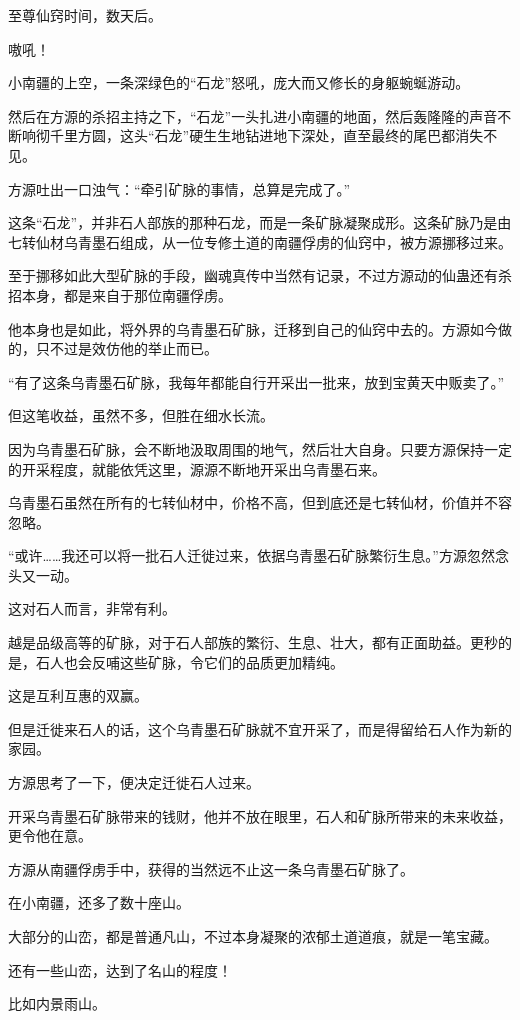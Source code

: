 \begin{this_body}
至尊仙窍时间，数天后。

嗷吼！

小南疆的上空，一条深绿色的“石龙”怒吼，庞大而又修长的身躯蜿蜒游动。

然后在方源的杀招主持之下，“石龙”一头扎进小南疆的地面，然后轰隆隆的声音不断响彻千里方圆，这头“石龙”硬生生地钻进地下深处，直至最终的尾巴都消失不见。

方源吐出一口浊气：“牵引矿脉的事情，总算是完成了。”

这条“石龙”，并非石人部族的那种石龙，而是一条矿脉凝聚成形。这条矿脉乃是由七转仙材乌青墨石组成，从一位专修土道的南疆俘虏的仙窍中，被方源挪移过来。

至于挪移如此大型矿脉的手段，幽魂真传中当然有记录，不过方源动的仙蛊还有杀招本身，都是来自于那位南疆俘虏。

他本身也是如此，将外界的乌青墨石矿脉，迁移到自己的仙窍中去的。方源如今做的，只不过是效仿他的举止而已。

“有了这条乌青墨石矿脉，我每年都能自行开采出一批来，放到宝黄天中贩卖了。”

但这笔收益，虽然不多，但胜在细水长流。

因为乌青墨石矿脉，会不断地汲取周围的地气，然后壮大自身。只要方源保持一定的开采程度，就能依凭这里，源源不断地开采出乌青墨石来。

乌青墨石虽然在所有的七转仙材中，价格不高，但到底还是七转仙材，价值并不容忽略。

“或许……我还可以将一批石人迁徙过来，依据乌青墨石矿脉繁衍生息。”方源忽然念头又一动。

这对石人而言，非常有利。

越是品级高等的矿脉，对于石人部族的繁衍、生息、壮大，都有正面助益。更秒的是，石人也会反哺这些矿脉，令它们的品质更加精纯。

这是互利互惠的双赢。

但是迁徙来石人的话，这个乌青墨石矿脉就不宜开采了，而是得留给石人作为新的家园。

方源思考了一下，便决定迁徙石人过来。

开采乌青墨石矿脉带来的钱财，他并不放在眼里，石人和矿脉所带来的未来收益，更令他在意。

方源从南疆俘虏手中，获得的当然远不止这一条乌青墨石矿脉了。

在小南疆，还多了数十座山。

大部分的山峦，都是普通凡山，不过本身凝聚的浓郁土道道痕，就是一笔宝藏。

还有一些山峦，达到了名山的程度！

比如内景雨山。


\end{this_body}
